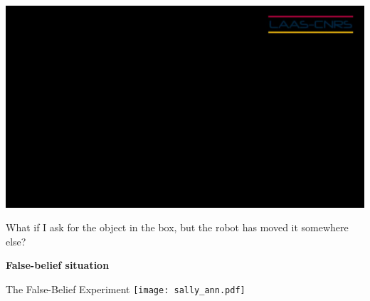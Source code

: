 \documentclass[xcolor=table]{beamer}
\begin{document}
%
%

\begin{frame}[plain]

    \begin{center}
        \includegraphics[width=0.8\linewidth]{videos/this_box_thumb}

        What if I ask for the object in the box, but the robot has
        moved it somewhere else?


    \pause

        {\bf False-belief situation}
    \end{center}
\end{frame}


\begin{frame}{The False-Belief Experiment}
    \centering
    \texttt{[image: sally\_ann.pdf]}

\end{frame}

\end{document}
